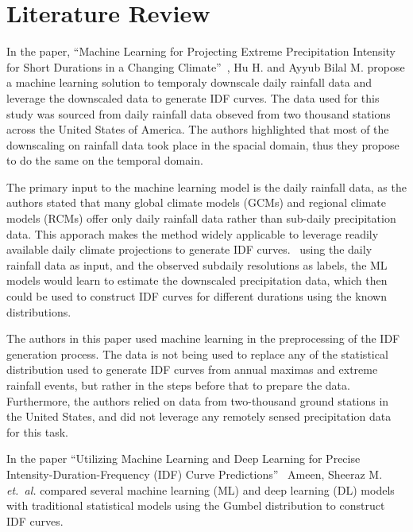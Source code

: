 \section{Literature Review}

In the paper, ``Machine Learning for Projecting Extreme Precipitation Intensity for Short Durations in a Changing Climate''~\cite{geosciences9050209}, Hu H. and Ayyub Bilal M. propose a machine learning solution to temporaly downscale daily rainfall data and leverage the downscaled data to generate IDF curves. The data used for this study was sourced from daily rainfall data obseved from two thousand stations across the United States of America. The authors highlighted that most of the downscaling on rainfall data took place in the spacial domain, thus they propose to do the same on the temporal domain.~\cite{geosciences9050209}

The primary input to the machine learning model is the daily rainfall data, as the authors stated that many global climate models (GCMs) and regional climate models (RCMs) offer only daily rainfall data rather than sub-daily precipitation data. This apporach makes the method widely applicable to leverage readily available daily climate projections to generate IDF curves.~\cite{geosciences9050209} using the daily rainfall data as input, and the observed subdaily resolutions as labels, the ML models would learn to estimate the downscaled precipitation data, which then could be used to construct IDF curves for different durations using the known distributions.

The authors in this paper used machine learning in the preprocessing of the IDF generation process. The data is not being used to replace any of the statistical distribution used to generate IDF curves from  annual maximas and extreme rainfall events, but rather in the steps before that to prepare the data. Furthermore, the authors relied on data from two-thousand ground stations in the United States, and did not leverage any remotely sensed precipitation data for this task.

\vspace{1em}

In the paper ``Utilizing Machine Learning and Deep Learning for Precise Intensity-Duration-Frequency (IDF) Curve Predictions''~\cite{idfkoya} Ameen, Sheeraz M. \emph{et.~al.} compared several machine learning (ML) and deep learning (DL) models with traditional statistical models using the Gumbel distribution to construct IDF curves.

